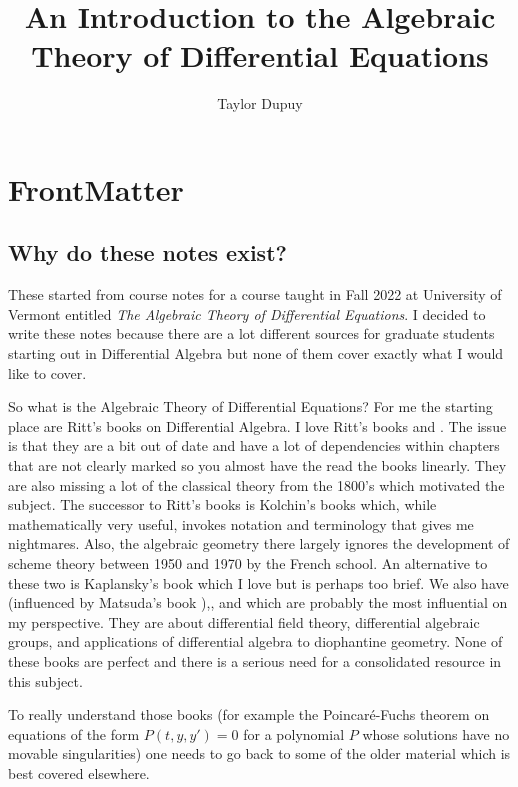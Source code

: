 \documentclass[12pt]{book}
\title{An Introduction to the Algebraic Theory of Differential Equations}
\author{Taylor Dupuy }
\numberwithin{equation}{section}
\theoremstyle{definition}
\theoremstyle{remark}
\begin{document}
\maketitle

\frontmatter

\chapter{FrontMatter}

\section*{Why do these notes exist?}
These started from course notes for a course taught in Fall 2022 at University of Vermont entitled \emph{The Algebraic Theory of Differential Equations}. 
I decided to write these notes because there are a lot different sources for graduate students starting out in Differential Algebra but none of them cover exactly what I would like to cover. 

So what is the Algebraic Theory of Differential Equations? 
For me the starting place are Ritt's books on Differential Algebra. 
I love Ritt's books \cite{Ritt1932} and \cite{Ritt1950}. 
The issue is that they are a bit out of date and have a lot of dependencies within chapters that are not clearly marked so you almost have the read the books linearly. 
They are also missing a lot of the classical theory from the 1800's which motivated the subject. 
The successor to Ritt's books is Kolchin's books \cite{Kolchin1973} which, while mathematically very useful, invokes notation and terminology that gives me nightmares. 
Also, the algebraic geometry there largely ignores the development of scheme theory between 1950 and 1970 by the French school. 
An alternative to these two is Kaplansky's book \cite{Kaplansky1976} which I love but is perhaps too brief. 
We also have \cite{Buium1986} (influenced by Matsuda's book \cite{Matsuda1980}),\cite{Buium1992}, and \cite{Buium1994} which are probably the most influential on my perspective. 
They are about differential field theory, differential algebraic groups, and applications of differential algebra to diophantine geometry.
None of these books are perfect and there is a serious need for a consolidated resource in this subject.

To really understand those books (for example the Poincar\'e-Fuchs theorem on equations of the form $P(t,y,y')=0$ for a polynomial $P$ whose solutions have no movable singularities) one needs to go back to some of the older material which is best covered elsewhere. 
\end{document}
